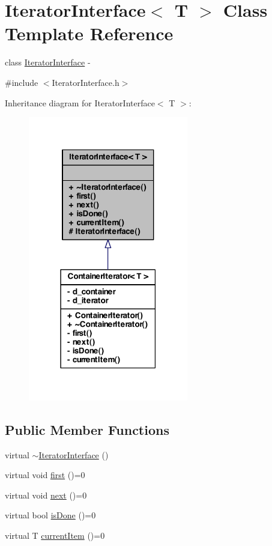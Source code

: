 \hypertarget{class_iterator_interface}{
\section{IteratorInterface$<$ T $>$ Class Template Reference}
\label{class_iterator_interface}
}


class \hyperlink{class_iterator_interface}{IteratorInterface} -\/  




{\ttfamily \#include $<$IteratorInterface.h$>$}



Inheritance diagram for IteratorInterface$<$ T $>$:
\nopagebreak
\begin{figure}[H]
\begin{center}
\leavevmode
\includegraphics[width=198pt]{class_iterator_interface__inherit__graph}
\end{center}
\end{figure}
\subsection*{Public Member Functions}
\begin{DoxyCompactItemize}
\item 
virtual \hyperlink{class_iterator_interface_a4aa5b5b0bf88e8fabcaa655fdd52b6cf}{$\sim$IteratorInterface} ()
\item 
virtual void \hyperlink{class_iterator_interface_a0376168477377aad0442f89bb0f28d2b}{first} ()=0
\item 
virtual void \hyperlink{class_iterator_interface_aec2d9693127c9909bc6fc2732bfe5bac}{next} ()=0
\item 
virtual bool \hyperlink{class_iterator_interface_a8b405842b32836c6b3587bf26f09a0d4}{isDone} ()=0
\item 
virtual T \hyperlink{class_iterator_interface_a1724076d202e22aefd13325c06a91033}{currentItem} ()=0
\end{DoxyCompactItemize}

